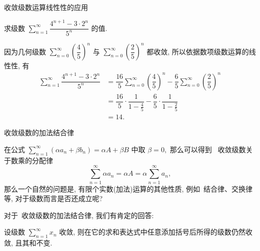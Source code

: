 \begin{frame}{收敛级数运算线性性的应用}

\begin{eg}
\begin{center}
求级数 $\sum\limits_{n=1}^\infty \dfrac{4^{n+1} - 3 \cdot 2^n}{5^n}$ 的值.
\end{center}
\end{eg}

\pause
\vspace*{0.5em}

因为几何级数 $\sum\limits_{n=0}^\infty \left( \dfrac{4}{5} \right)^n$ 与 $\sum\limits_{n=0}^\infty \left( \dfrac{2}{5} \right)^n$ 都收敛, 所以依据数项级数运算的线性性, 有
\begin{align*}
\sum\limits_{n=1}^\infty \dfrac{4^{n+1} - 3 \cdot 2^n}{5^n} & = \dfrac{16}{5} \sum\limits_{n=0}^\infty \left( \dfrac{4}{5} \right)^n - \dfrac{6}{5} \sum\limits_{n=0}^\infty \left( \dfrac{2}{5} \right)^n \\
& = \dfrac{16}{5} \cdot \dfrac{1}{1 - \frac{4}{5}} - \dfrac{6}{5} \cdot \dfrac{1}{1 - \frac{2}{5}} \\
& = 14.
\end{align*}

\end{frame}


\begin{frame}{收敛级数的加法结合律}

在公式 $\sum\limits_{n=1}^\infty (\alpha a_n + \beta b_n) = \alpha A + \beta B$ 中取 $\beta = 0,$ 那么可以得到~{\color{red} 收敛级数关于数乘的分配律}
\[\sum\limits_{n=1}^\infty \alpha a_n = \alpha A = \alpha \sum\limits_{n=1}^\infty a_n,\]
那么一个自然的问题是, 有限个实数(加法)运算的其他性质, 例如~{\color{red}结合律、交换律}等, 对于级数而言是否还成立呢?

\pause
\vspace{1em}

对于~{\color{red}收敛级数}的加法结合律, 我们有肯定的回答:

\begin{thm}[数项级数的加法结合律]
设级数 $\sum\limits_{n=1}^\infty x_n$ 收敛, 则在它的求和表达式中任意添加括号后所得的级数仍然收敛, 且其和不变.
\end{thm}

\end{frame}


